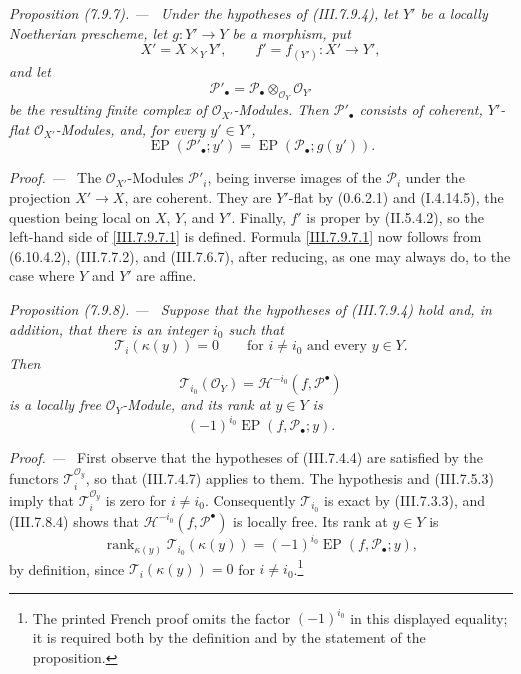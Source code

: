 \documentclass[10pt,oneside]{book}
\newcommand{\sh}[1]{\mathscr{#1}}
\newcommand{\kres}{\kappa}
\newcommand{\sref}[2][]{(#2)}
\newenvironment{proposition}[1][]{\par\medskip\noindent\itshape Proposition (#1). ---\ }{\par}
\newenvironment{proof}{\par\medskip\noindent\textit{Proof. ---\ }}{\par}
\begin{document}
\begin{proposition}[7.9.7]
\label{III.7.9.7}
Under the hypotheses of \sref{III.7.9.4}, let $Y'$ be a
locally Noetherian prescheme, let $g:Y'\to Y$ be a
morphism, put
\[
  X'=X\times_Y Y',\qquad
  f'=f_{(Y')}:X'\longrightarrow Y',
\]
and let
\[
  \sh{P}'_\bullet
  =
  \sh{P}_\bullet\otimes_{\sh{O}_Y}\sh{O}_{Y'}
\]
be the resulting finite complex of $\sh{O}_{X'}$-Modules.
Then $\sh{P}'_\bullet$ consists of coherent,
$Y'$-flat $\sh{O}_{X'}$-Modules, and, for every
$y'\in Y'$,
\[
  \operatorname{EP}(\sh{P}'_\bullet;y')
  =
  \operatorname{EP}(\sh{P}_\bullet;g(y')).
  \tag{7.9.7.1}\label{III.7.9.7.1}
\]
\end{proposition}

\begin{proof}
The $\sh{O}_{X'}$-Modules $\sh{P}'_i$, being inverse images
of the $\sh{P}_i$ under the projection $X'\to X$, are
coherent.  They are $Y'$-flat by \sref[0]{0.6.2.1} and
\sref[I]{I.4.14.5}, the question being local on $X$, $Y$,
and $Y'$.  Finally, $f'$ is proper by
\sref[II]{II.5.4.2}, so the left-hand side of
\eqref{III.7.9.7.1} is defined.  Formula
\eqref{III.7.9.7.1} now follows from
\textup{(6.10.4.2)}, \sref{III.7.7.2}, and
\sref{III.7.6.7}, after reducing, as one may always do, to
the case where $Y$ and $Y'$ are affine.
\end{proof}

\begin{proposition}[7.9.8]
\label{III.7.9.8}
Suppose that the hypotheses of \sref{III.7.9.4} hold and,
in addition, that there is an integer $i_0$ such that
\[
  \sh{T}_i(\kres(y))=0
  \qquad\text{for $i\neq i_0$ and every $y\in Y$.}
\]
Then
\[
  \sh{T}_{i_0}(\sh{O}_Y)
  =
  \mathscr{H}^{-i_0}(f,\sh{P}^\bullet)
\]
is a locally free $\sh{O}_Y$-Module, and its rank at
$y\in Y$ is
\[
  (-1)^{i_0}\operatorname{EP}(f,\sh{P}_\bullet;y).
\]
\end{proposition}

\begin{proof}
First observe that the hypotheses of \sref{III.7.4.4} are
satisfied by the functors $\sh{T}^{\sh{O}_y}_i$, so that
\sref{III.7.4.7} applies to them.  The hypothesis and
\sref{III.7.5.3} imply that
$\sh{T}^{\sh{O}_y}_i$ is zero for $i\neq i_0$.
Consequently $\sh{T}_{i_0}$ is exact by
\sref{III.7.3.3}, and \sref{III.7.8.4} shows that
$\mathscr{H}^{-i_0}(f,\sh{P}^\bullet)$ is locally free.
Its rank at $y\in Y$ is
\[
  \operatorname{rank}_{\kres(y)}
    \sh{T}_{i_0}(\kres(y))
  =
  (-1)^{i_0}\operatorname{EP}(f,\sh{P}_\bullet;y),
\]
by definition, since $\sh{T}_i(\kres(y))=0$ for
$i\neq i_0$.\footnote{The printed French proof omits the
factor $(-1)^{i_0}$ in this displayed equality; it is
required both by the definition and by the statement of
the proposition.}
\end{proof}
\end{document}
